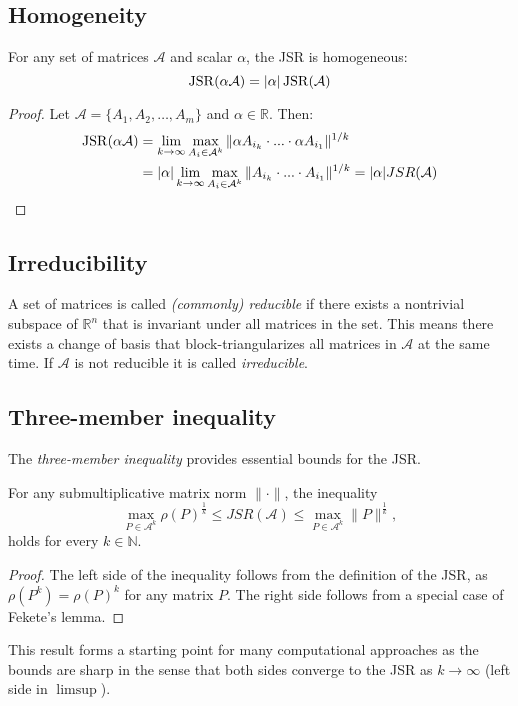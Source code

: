 \subsection*{Homogeneity}
\begin{proposition}
    For any set of matrices $\mathcal{A}$ and scalar $\alpha$, the JSR is homogeneous:
    \begin{equation}
        \operatorname{JSR}(\alpha \mathcal{A}) = |\alpha| \operatorname{JSR}(\mathcal{A})
    \end{equation}
\end{proposition}
\begin{proof}
    Let $\mathcal{A} = \{A_1, A_2, \dots, A_m\}$ and $\alpha \in \mathbb{R}$. Then:
    \begin{align*}
        \operatorname{JSR}(\alpha \mathcal{A}) &= \lim_{k \to \infty} \max_{A_i \in \mathcal{A}^k} \|\alpha A_{i_k} \cdot ... \cdot \alpha A_{i_1}\|^{1/k} \\
        &= |\alpha| \lim_{k \to \infty} \max_{A_i \in \mathcal{A}^k} \|A_{i_k} \cdot ... \cdot A_{i_1}\|^{1/k} = |\alpha| JSR(\mathcal{A})
    \end{align*}
\end{proof}

\subsection*{Irreducibility}
\begin{definition}
    A set of matrices is called \emph{(commonly) reducible} if there exists a nontrivial subspace of $\mathbb{R}^n$ that is invariant under all matrices in the set. This means there exists a change of basis that block-triangularizes all matrices in $\mathcal{A}$ at the same time. If $\mathcal{A}$ is not reducible it is called \emph{irreducible}. 
\end{definition}

\subsection*{Three-member inequality}
The \emph{three-member inequality} provides essential bounds for the JSR. 

\begin{proposition}
    For any submultiplicative matrix norm $\|\cdot\|$, the inequality
    \begin{equation}
    \max_{P \in \mathcal{A}^k} \rho(P)^{\frac{1}{k}} \leq JSR(\mathcal{A}) \leq \max_{P \in \mathcal{A}^k} \| P\|^{\frac{1}{k}},
    \label{eq:three-member}
    \end{equation}
    holds for every $k \in \mathbb{N}$.
\end{proposition}
\begin{proof}
    The left side of the inequality follows from the definition of the JSR, as $\rho(P^k) = \rho(P)^k$ for any matrix $P$. The right side follows from a special case of Fekete's lemma.
\end{proof}
This result forms a starting point for many computational approaches as the bounds are sharp in the sense that both sides converge to the JSR as $k\rightarrow \infty$ (left side in $\limsup$).

